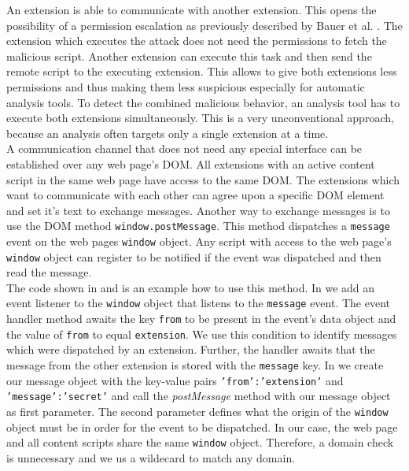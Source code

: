 			An extension is able to communicate with another extension. This opens the possibility of a permission escalation as previously described by Bauer et al. \cite{extensions:cns14}. The extension which executes the attack does not need the permissions to fetch the malicious script. Another extension can execute this task and then send the remote script to the executing extension. This allows to give both extensions less permissions and thus making them less suspicious especially for automatic analysis tools. To detect the combined malicious behavior, an analysis tool has to execute both extensions simultaneously. This is a very unconventional approach, because an analysis often targets only a single extension at a time. \\
			
			A communication channel that does not need any special interface can be established over any web page's DOM. All extensions with an active content script in the same web page have access to the same DOM. The extensions which want to communicate with each other can agree upon a specific DOM element and set it's text to exchange messages. Another way to exchange messages is to use the DOM method \texttt{window.postMessage}. This method dispatches a \texttt{message} event on the web pages \texttt{window} object. Any script with access to the web page's \texttt{window} object can register to be notified if the event was dispatched and then read the message. \\
			
			The code shown in  and  is an example how to use this method. In  we add an event listener to the \texttt{window} object that listens to the \texttt{message} event. The event handler method awaits the key \texttt{from} to be present in the event's data object and the value of \texttt{from} to equal \texttt{extension}. We use this condition to identify messages which were dispatched by an extension. Further, the handler awaits that the message from the other extension is stored with the \texttt{message} key. In  we create our message object with the key-value pairs \texttt{'from':'extension'} and \texttt{'message':'secret'} and call the \textit{postMessage} method with our message object as first parameter. The second parameter defines what the origin of the \texttt{window} object must be in order for the event to be dispatched. In our case, the web page and all content scripts share the same \texttt{window} object. Therefore, a domain check is unnecessary and we us a wildecard to match any domain.
			
